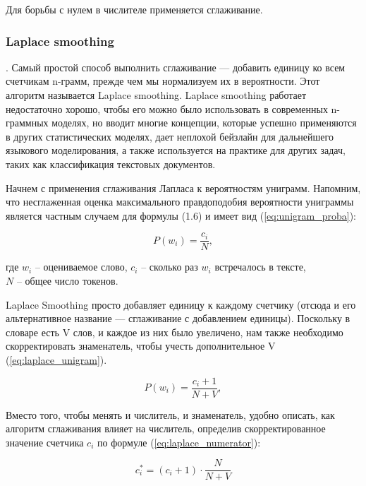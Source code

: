 Для борьбы с нулем в числителе применяется сглаживание. 

\subsubsection{Laplace smoothing}. Самый простой способ выполнить сглаживание --- добавить единицу ко всем счетчикам n-грамм, прежде чем
мы нормализуем их в вероятности. Этот алгоритм называется
Laplace smoothing. Laplace smoothing работает недостаточно хорошо, чтобы его можно было использовать в современных n-граммных моделях, но вводит многие концепции, которые успешно применяются в других статистических моделях, дает неплохой бейзлайн для дальнейшего языкового моделирования, а также используется на практике для других задач, таких как классификация текстовых документов.

Начнем с применения сглаживания Лапласа к вероятностям униграмм.
Напомним, что несглаженная оценка максимального правдоподобия вероятности униграммы является частным случаем для формулы (1.6) и имеет вид (\ref{eq:unigram_proba}):

\begin{equation}
	\label{eq:unigram_proba}
	P(w_i) = \frac{c_i}{N},
\end{equation}
\begin{explanation}
	где $w_i$ -- оцениваемое слово, $c_i$ -- сколько раз $w_i$ встречалось в тексте, \\$N$ -- общее число токенов.
\end{explanation}

Laplace Smoothing просто добавляет единицу к каждому счетчику (отсюда и его альтернативное название — сглаживание с добавлением единицы). Поскольку в словаре есть V слов, и каждое из них было увеличено, нам также необходимо скорректировать знаменатель, чтобы учесть дополнительное V (\ref{eq:laplace_unigram}).

\begin{equation}
	\label{eq:laplace_unigram}
	P(w_i) = \frac{c_i + 1}{N + V},
\end{equation}

Вместо того, чтобы менять и числитель, и знаменатель, удобно
описать, как алгоритм сглаживания влияет на числитель, определив скорректированное значение счетчика $c_i$ по формуле (\ref{eq:laplace_numerator}):

\begin{equation}
	\label{eq:laplace_numerator}
	c_i^* = (c_i + 1) \cdot \frac{N}{N + V}
\end{equation}

